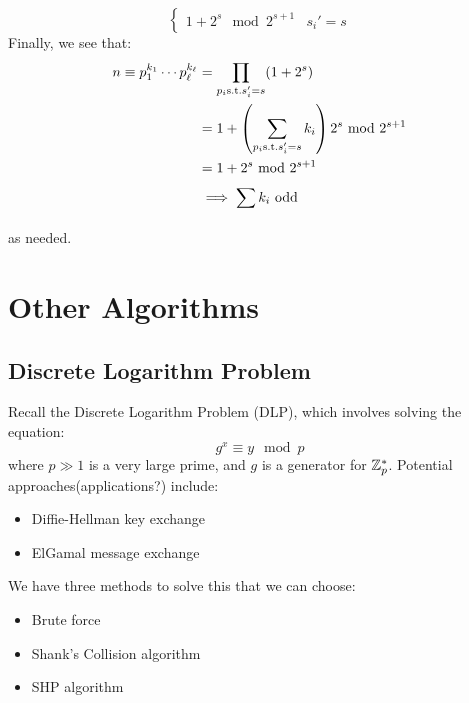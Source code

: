 \documentclass{article}
\begin{document}
\begin{pf}[source=Primary Source Material]
\begin{enumerate}
\begin{enumerate}
\begin{equation*}
\begin{cases}
                    1 + 2^{s} \mod 2^{s+1} & s_{i}' = s \end{cases}
                \end{equation*}
                Finally, we see that:
                \begin{align*}
                    n \equiv p_{1}^{k_{1}}\cdots p_{\ell}^{k_{\ell}}
                    & = \prod_{p_{i} \textrm{s.t.} s_{i}'=s} (1 + 2^{s}) \\
                    & = 1 + \left( \sum_{p_{i}\textrm{s.t.}s_{i}'=s}^{} {k_{i}}  \right)2^{s}
                    \ \mathrm{mod}\ 2^{s+1} \\
                    & = 1 + 2^{s} \ \mathrm{mod}\ 2^{s+1} \\
                    & \implies \sum_{}^{} {k_{i}} \textrm{ odd}
                \end{align*}
                as needed.
        \end{enumerate}
    \end{enumerate}
\end{pf}

\newpage
\section{Other Algorithms}
\subsection{Discrete Logarithm Problem}


Recall the Discrete Logarithm Problem (DLP), which involves solving the equation:
\begin{equation*}
    g^{x} \equiv y \mod p
\end{equation*}
where $ p \gg 1 $ is a very large prime, and $ g $ is a generator for $ \mathbb{Z}_{p}^{*} $.
Potential approaches(applications?) include:
\begin{itemize}
    \item Diffie-Hellman key exchange
    \item ElGamal message exchange
\end{itemize}

We have three methods to solve this that we can choose:
\begin{itemize}
    \item Brute force
    \item Shank's Collision algorithm
    \item SHP algorithm
\end{itemize}
\end{document}
